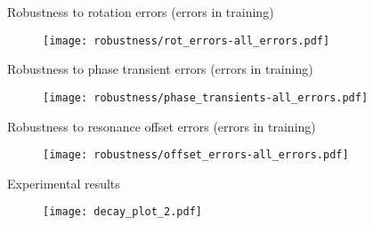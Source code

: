 \documentclass{beamer}
\begin{document}
\begin{frame}{Robustness to rotation errors (errors in training)}

\begin{figure}
    \centering
    \texttt{[image: robustness/rot\_errors-all\_errors.pdf]}
\end{figure}

\end{frame}

\begin{frame}{Robustness to phase transient errors (errors in training)}

\begin{figure}
    \centering
    \texttt{[image: robustness/phase\_transients-all\_errors.pdf]}
\end{figure}

\end{frame}

\begin{frame}{Robustness to resonance offset errors (errors in training)}

\begin{figure}
    \centering
    \texttt{[image: robustness/offset\_errors-all\_errors.pdf]}
\end{figure}

\end{frame}

\begin{frame}{Experimental results}

\begin{figure}
\centering
\texttt{[image: decay\_plot\_2.pdf]}
\end{figure}

\end{frame}
\end{document}
